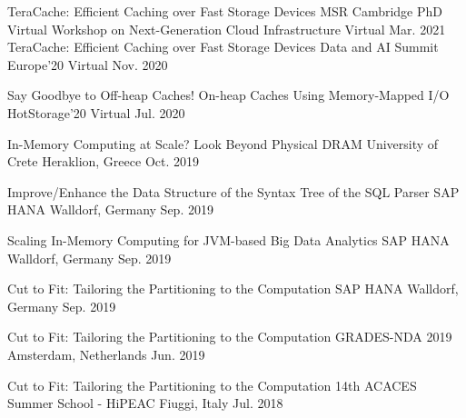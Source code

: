 

\begin{cvhonors}
  \cvhonor
    {TeraCache: Efficient Caching over Fast Storage Devices} %
    {MSR Cambridge PhD Virtual Workshop on Next-Generation Cloud Infrastructure} %
    {Virtual} %
    {Mar. 2021} %
  \cvhonor
    {TeraCache: Efficient Caching over Fast Storage Devices} %
    {Data and AI Summit Europe'20} %
    {Virtual} %
    {Nov. 2020} %

  \cvhonor
    {Say Goodbye to Off-heap Caches! On-heap Caches Using Memory-Mapped I/O} %
    {HotStorage'20} %
    {Virtual} %
    {Jul. 2020} %

  \cvhonor
    {In-Memory Computing at Scale? Look Beyond Physical DRAM} %
    {University of Crete} %
    {Heraklion, Greece} %
    {Oct. 2019} %

  \cvhonor
    {Improve/Enhance the Data Structure of the Syntax Tree of the SQL Parser} %
    {SAP HANA} %
    {Walldorf, Germany} %
    {Sep. 2019} %


  \cvhonor
    {Scaling In-Memory Computing for JVM-based Big Data Analytics} %
    {SAP HANA} %
    {Walldorf, Germany} %
    {Sep. 2019} %

  \cvhonor
    {Cut to Fit: Tailoring the Partitioning to the Computation} %
    {SAP HANA} %
    {Walldorf, Germany} %
    {Sep. 2019} %

  \cvhonor
    {Cut to Fit: Tailoring the Partitioning to the Computation} %
    {GRADES-NDA 2019} %
    {Amsterdam, Netherlands} %
    {Jun. 2019} %

  \cvhonor
    {Cut to Fit: Tailoring the Partitioning to the Computation} %
    {14th ACACES Summer School - HiPEAC} %
    {Fiuggi, Italy} %
    {Jul. 2018} %

\end{cvhonors}
